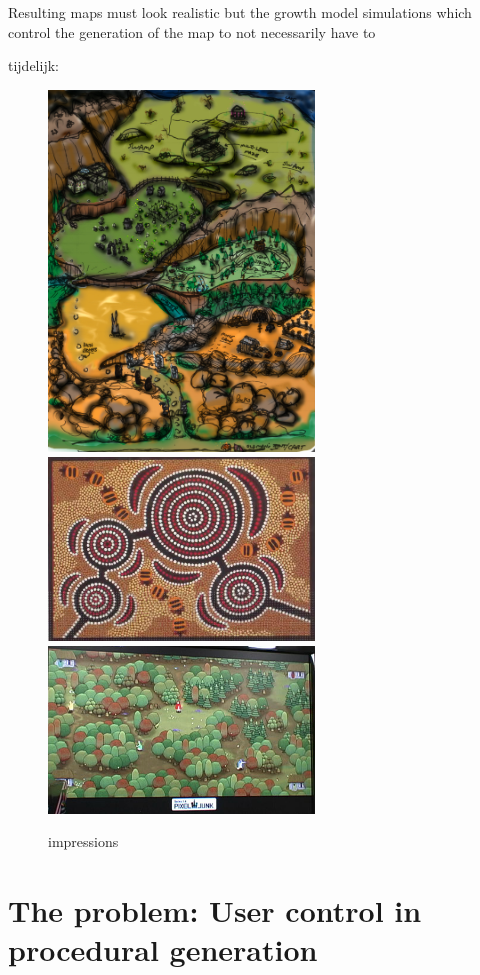 \documentclass{article}
\begin{document}
Resulting maps must look realistic but the growth model simulations which control the generation of the map to not necessarily have to       


tijdelijk: 

\begin{figure}
\centering
  \begin{center}
	\includegraphics[width=200pt]{images/map_design.jpg}
	\includegraphics[width=200pt]{images/aboriginal_art.jpg}
	\includegraphics[width=200pt]{images/forest.jpg}
\end{center}
	\caption{impressions}\label{fig:global_map}
\end{figure}


\section{The problem: User control in procedural generation}
\end{document}
